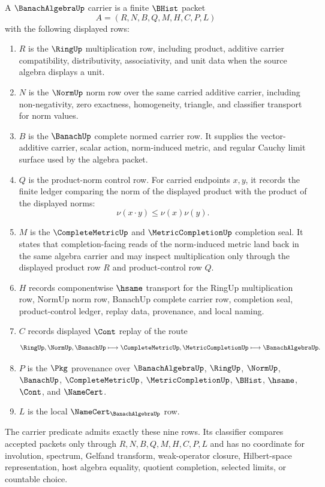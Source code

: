 \begin{definition}
\label{def:banach-algebra-carrier}
A $\BanachAlgebraUp$ carrier is a finite $\BHist$ packet
$$
A=(R,N,B,Q,M,H,C,P,L)
$$
with the following displayed rows:
\begin{enumerate}
\item $R$ is the $\RingUp$ multiplication row, including product, additive carrier compatibility, distributivity, associativity, and unit data when the source algebra displays a unit.
\item $N$ is the $\NormUp$ norm row over the same carried additive carrier, including non-negativity, zero exactness, homogeneity, triangle, and classifier transport for norm values.
\item $B$ is the $\BanachUp$ complete normed carrier row. It supplies the vector-additive carrier, scalar action, norm-induced metric, and regular Cauchy limit surface used by the algebra packet.
\item $Q$ is the product-norm control row. For carried endpoints $x,y$, it records the finite ledger comparing the norm of the displayed product with the product of the displayed norms:
$$
\nu(x\cdot y)\leq \nu(x)\nu(y).
$$
\item $M$ is the $\CompleteMetricUp$ and $\MetricCompletionUp$ completion seal. It states that completion-facing reads of the norm-induced metric land back in the same algebra carrier and may inspect multiplication only through the displayed product row $R$ and product-control row $Q$.
\item $H$ records componentwise $\hsame$ transport for the RingUp multiplication row, NormUp norm row, BanachUp complete carrier row, completion seal, product-control ledger, replay data, provenance, and local naming.
\item $C$ records displayed $\Cont$ replay of the route
$$
\RingUp,\NormUp,\BanachUp \longmapsto \CompleteMetricUp,\MetricCompletionUp \longmapsto \BanachAlgebraUp .
$$
\item $P$ is the $\Pkg$ provenance over $\BanachAlgebraUp$, $\RingUp$, $\NormUp$, $\BanachUp$, $\CompleteMetricUp$, $\MetricCompletionUp$, $\BHist$, $\hsame$, $\Cont$, and $\NameCert$.
\item $L$ is the local $\NameCert_{\BanachAlgebraUp}$ row.
\end{enumerate}
The carrier predicate admits exactly these nine rows. Its classifier compares accepted packets only through $R,N,B,Q,M,H,C,P,L$ and has no coordinate for involution, spectrum, Gelfand transform, weak-operator closure, Hilbert-space representation, host algebra equality, quotient completion, selected limits, or countable choice.
\end{definition}

